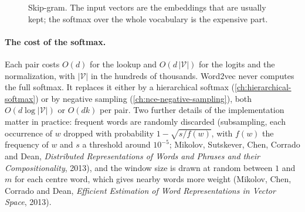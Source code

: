 \begin{notechapter}
\begin{figure}[ht]
\centering
{}
\caption{Skip-gram. The input vectors are the embeddings that are usually kept; the softmax over the
whole vocabulary is the expensive part.}
\label{word-embeddings:fig:skipgram}
\end{figure}

\paragraph{The cost of the softmax.} Each pair costs $O(d)$ for the lookup and $O(d\,|\mathcal V|)$ for the logits and the
normalization, with $|\mathcal V|$ in the hundreds of thousands. Word2vec never computes the full softmax.
It replaces it either by a hierarchical softmax (\cref{ch:hierarchical-softmax}) or by negative
sampling (\cref{ch:nce-negative-sampling}), both $O(d\log|\mathcal V|)$ or $O(dk)$ per pair. Two further details of the
implementation matter in practice: frequent words are randomly discarded (subsampling,
each occurrence of $w$ dropped with probability $1 - \sqrt{s/f(w)}$, with $f(w)$ the frequency of $w$ and $s$ a threshold
around $10^{-5}$; Mikolov, Sutskever, Chen, Corrado and Dean,
\emph{Distributed Representations of Words and Phrases and their Compositionality}, 2013), and the window size is drawn at random between $1$ and $m$ for each centre word, which
gives nearby words more weight (Mikolov, Chen, Corrado and Dean, \emph{Efficient Estimation of Word
Representations in Vector Space}, 2013).


\end{notechapter}
